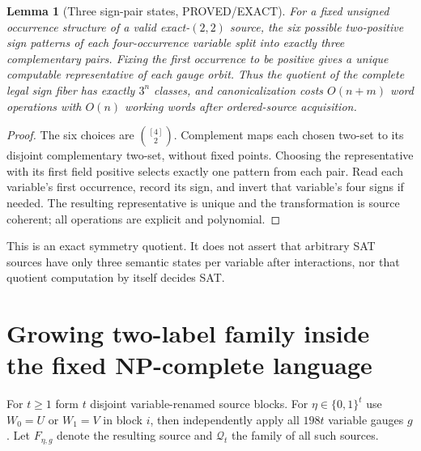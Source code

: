 \documentclass[11pt]{article}
\newtheorem{lemma}{Lemma}
\begin{document}
\begin{lemma}[Three sign-pair states, PROVED/EXACT]
For a fixed unsigned occurrence structure of a valid exact-$(2,2)$ source, the six possible two-positive sign patterns of each four-occurrence variable split into exactly three complementary pairs. Fixing the first occurrence to be positive gives a unique computable representative of each gauge orbit. Thus the quotient of the complete legal sign fiber has exactly $3^n$ classes, and canonicalization costs $O(n+m)$ word operations with $O(n)$ working words after ordered-source acquisition.
\end{lemma}
\begin{proof}
The six choices are $\binom{[4]}2$. Complement maps each chosen two-set to its disjoint complementary two-set, without fixed points. Choosing the representative with its first field positive selects exactly one pattern from each pair. Read each variable's first occurrence, record its sign, and invert that variable's four signs if needed. The resulting representative is unique and the transformation is source coherent; all operations are explicit and polynomial.
\end{proof}
This is an exact symmetry quotient. It does not assert that arbitrary SAT sources have only three semantic states per variable after interactions, nor that quotient computation by itself decides SAT.

\section{Growing two-label family inside the fixed NP-complete language}
For $t\ge1$ form $t$ disjoint variable-renamed source blocks. For $\eta\in\{0,1\}^t$ use $W_0=U$ or $W_1=V$ in block $i$, then independently apply all $198t$ variable gauges $g$. Let $F_{\eta,g}$ denote the resulting source and $\mathcal Q_t$ the family of all such sources.
\end{document}

